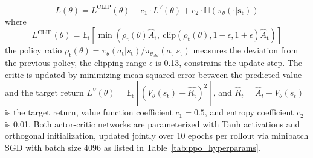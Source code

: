 \documentclass[preprint,12pt]{elsarticle}
\begin{document}
\begin{equation}
L(\theta) = L^{\text{CLIP}}(\theta) - c_{1}\cdot L^{V}(\theta) + c_{2} \cdot\mathbb{H}(\pi_\theta(\cdot|\mathbf{s}_\text{t}))
\label{objective}
\end{equation}
where \[L^{\text{CLIP}}(\theta) = \mathbb{E}_\text{t}\left[\min\left(\rho_\text{t}(\theta)\hat{A}_\text{t},\ \text{clip}(\rho_\text{t}(\theta), 1 - \epsilon, 1 + \epsilon)\hat{A}_\text{t}\right)\right]\]
the policy ratio $\rho_\text{t}(\theta) = \pi_{\theta}(a_\text{t}|s_\text{t})/\pi_{\theta_{old}}(a_\text{t}|s_\text{t})$ measures the deviation from the previous policy, the clipping range $\epsilon$ is 0.13, constrains the update step. The critic is updated by minimizing
mean squared error between the predicted value and the target return $
L^{V}(\theta) = \mathbb{E}_\text{t}[(V_{\theta}(s_\text{t}) - \hat{R_\text{t}})^{2}]
$, and $\hat{R}_{t} = \hat{A}_{t} + V_{\theta}(s_{t})$ is the target return, value function coefficient $c_{1} = 0.5$, and entropy coefficient $c_{2}$ is 0.01. Both actor-critic networks are parameterized with Tanh activations and orthogonal initialization, updated jointly over 10 epochs per rollout via minibatch SGD with batch size 4096 as listed in Table~\ref{tab:ppo_hyperparams}.
\end{document}
